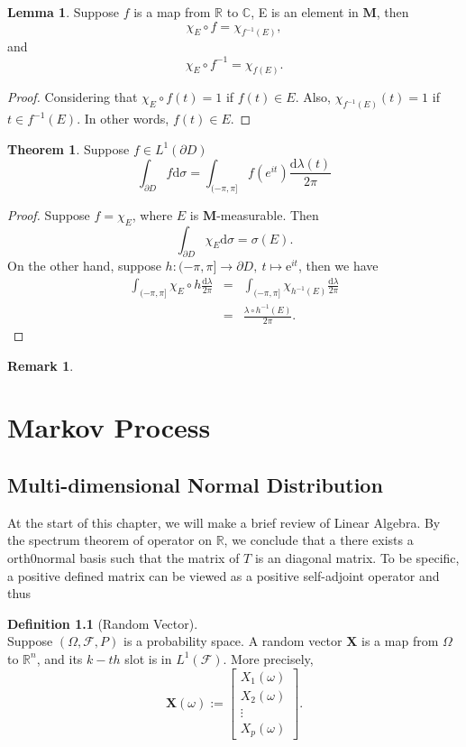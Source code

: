 \documentclass[12pt]{book}
\theoremstyle{definition}
\newtheorem{definition}{Definition}[chapter]
\newtheorem{theorem}{Theorem}[chapter]
\newtheorem{remark}{Remark}
\newtheorem{lemma}{Lemma}[section]
\newcommand{\R}{\mathbb{R}}
\newcommand{\C}{\mathbb{C}}
\newcommand{\E}{\mathrm{e}}
\newcommand{\X}{\mathbf{X}}
\newcommand{\D}{\mathrm{d}}
\begin{document}
\begin{lemma}
Suppose $f$ is a map from $\R$ to $\C$, E is an element in $\mathbf{M}$, then
$$
\chi_E \circ f = \chi_{f^{-1}(E)},
$$
and
$$
\chi_E \circ f^{-1} = \chi_{f(E)}.
$$
\begin{proof}
	Considering that $\chi_E \circ f (t)=1$ if $f(t)\in E$. Also, $\chi_{f^{-1}(E)}(t)=1$ if $t\in f^{-1}(E)$. In other words, $f(t) \in E$.
\end{proof}
\end{lemma}

\begin{theorem}
Suppose $f \in L^1(\partial D)$
	$$
	\int_{\partial D}f\D \sigma = \int_{(-\pi,\pi]}f(e^{it}) \frac{\D \lambda(t)}{2\pi}
	$$
\end{theorem}
\begin{proof}
Suppose $f=\chi_E$, where $E$ is $\mathbf{M}$-measurable. Then
$$
\int_{\partial D} \chi_E \D \sigma = \sigma(E).
$$ 
On the other hand, suppose $h:(-\pi,\pi] \to \partial D,\ t\mapsto \E^{it}$, then we have
\begin{eqnarray*}
	\int_{(-\pi,\pi]} \chi_E \circ h \frac{\D \lambda}{2\pi} &=& \int_{(-\pi,\pi]}\chi_{h^{-1}(E)} \frac{\D \lambda}{2\pi} \\
	&=& \frac{\lambda \circ h^{-1}(E)}{2\pi}.
\end{eqnarray*}
\end{proof}




\begin{remark}
	
\end{remark}



\chapter{Markov Process}
\section{Multi-dimensional Normal Distribution}
At the start of this chapter, we will make a brief review of Linear Algebra. By the spectrum theorem of operator on $\R$, we conclude that a there exists a orth0normal basis such that the matrix of $T$ is an diagonal matrix. To be specific, a positive defined matrix can be viewed as a positive self-adjoint operator and thus 
\begin{definition}[Random Vector] \ \\
Suppose $(\Omega,\mathcal{F},P)$ is a probability space. A random vector $\X$ is a map from $\Omega$ to $\R^n$, and its $k-th$ slot is in $L^1(\mathcal{F})$. More precisely,
$$
\X(\omega) := \begin{bmatrix}
	X_1(\omega) \\
	X_2(\omega) \\
	\vdots \\
	X_p(\omega)
\end{bmatrix}.
$$
\end{definition}
\end{document}
